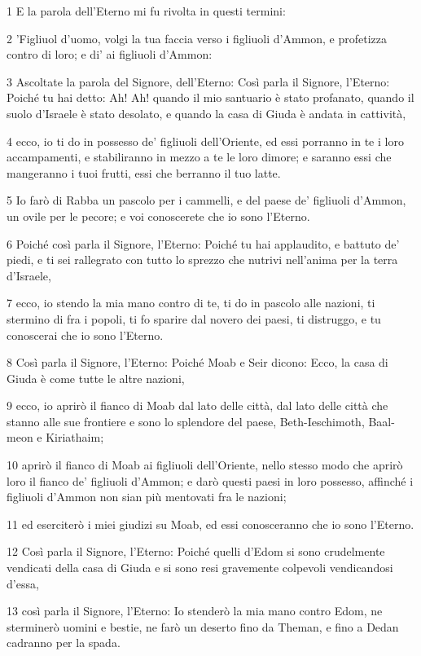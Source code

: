\par 1 E la parola dell'Eterno mi fu rivolta in questi termini:
\par 2 'Figliuol d'uomo, volgi la tua faccia verso i figliuoli d'Ammon, e profetizza contro di loro; e di' ai figliuoli d'Ammon:
\par 3 Ascoltate la parola del Signore, dell'Eterno: Così parla il Signore, l'Eterno: Poiché tu hai detto: Ah! Ah! quando il mio santuario è stato profanato, quando il suolo d'Israele è stato desolato, e quando la casa di Giuda è andata in cattività,
\par 4 ecco, io ti do in possesso de' figliuoli dell'Oriente, ed essi porranno in te i loro accampamenti, e stabiliranno in mezzo a te le loro dimore; e saranno essi che mangeranno i tuoi frutti, essi che berranno il tuo latte.
\par 5 Io farò di Rabba un pascolo per i cammelli, e del paese de' figliuoli d'Ammon, un ovile per le pecore; e voi conoscerete che io sono l'Eterno.
\par 6 Poiché così parla il Signore, l'Eterno: Poiché tu hai applaudito, e battuto de' piedi, e ti sei rallegrato con tutto lo sprezzo che nutrivi nell'anima per la terra d'Israele,
\par 7 ecco, io stendo la mia mano contro di te, ti do in pascolo alle nazioni, ti stermino di fra i popoli, ti fo sparire dal novero dei paesi, ti distruggo, e tu conoscerai che io sono l'Eterno.
\par 8 Così parla il Signore, l'Eterno: Poiché Moab e Seir dicono: Ecco, la casa di Giuda è come tutte le altre nazioni,
\par 9 ecco, io aprirò il fianco di Moab dal lato delle città, dal lato delle città che stanno alle sue frontiere e sono lo splendore del paese, Beth-Ieschimoth, Baal-meon e Kiriathaim;
\par 10 aprirò il fianco di Moab ai figliuoli dell'Oriente, nello stesso modo che aprirò loro il fianco de' figliuoli d'Ammon; e darò questi paesi in loro possesso, affinché i figliuoli d'Ammon non sian più mentovati fra le nazioni;
\par 11 ed eserciterò i miei giudizi su Moab, ed essi conosceranno che io sono l'Eterno.
\par 12 Così parla il Signore, l'Eterno: Poiché quelli d'Edom si sono crudelmente vendicati della casa di Giuda e si sono resi gravemente colpevoli vendicandosi d'essa,
\par 13 così parla il Signore, l'Eterno: Io stenderò la mia mano contro Edom, ne sterminerò uomini e bestie, ne farò un deserto fino da Theman, e fino a Dedan cadranno per la spada.
